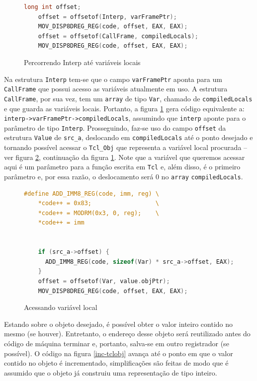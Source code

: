 \begin{figure}[h]
  \centering
  \begin{lstlisting}[language=C]
    long int offset;
    offset = offsetof(Interp, varFramePtr);
    MOV_DISP8DREG_REG(code, offset, EAX, EAX);
    offset = offsetof(CallFrame, compiledLocals);
    MOV_DISP8DREG_REG(code, offset, EAX, EAX);
  \end{lstlisting}
  \caption{Percorrendo Interp até variáveis locais\label{goto-varstruct}}
\end{figure}

Na estrutura \verb!Interp! tem-se que o campo \verb!varFramePtr!
aponta para um \verb!CallFrame! que possui acesso as variáveis atualmente em
uso. A estrutura \verb!CallFrame!, por sua vez, tem um
\verb!array! de tipo \verb!Var!, chamado de \verb!compiledLocals! e
que guarda as variáveis locais. Portanto, a figura
\ref{goto-varstruct} gera código equivalente a:
\verb!interp->varFramePtr->compiledLocals!, assumindo
que \verb!interp! aponte para o parâmetro de tipo
\verb!Interp!. Prosseguindo, faz-se uso do campo
\verb!offset! da estrutura \verb!Value! de \verb!src_a!, deslocando em
\verb!compiledLocals! até o ponto desejado e tornando possível acessar
o \verb!Tcl_Obj! que representa a variável local procurada -- ver figura
\ref{goto-localvar}, continuação da figura \ref{goto-varstruct}. Note
que a variável que queremos acessar aqui é um parâmetro para a função
escrita em \texttt{Tcl} e, além disso, é o primeiro parâmetro e, por
essa razão, o deslocamento será 0 no \verb!array! \verb!compiledLocals!.

\begin{figure}[h]
  \centering
  \begin{lstlisting}[language=C]
#define ADD_IMM8_REG(code, imm, reg) \
    *code++ = 0x83;                  \
    *code++ = MODRM(0x3, 0, reg);    \
    *code++ = imm


    if (src_a->offset) {
      ADD_IMM8_REG(code, sizeof(Var) * src_a->offset, EAX);
    }
    offset = offsetof(Var, value.objPtr);
    MOV_DISP8DREG_REG(code, offset, EAX, EAX);
  \end{lstlisting}
  \caption{Acessando variável local\label{goto-localvar}}
\end{figure}

Estando sobre o objeto desejado, é possível obter o valor inteiro
contido no mesmo (se houver). Entretanto, o endereço desse objeto será
reutilizado antes do código de máquina terminar e, portanto, salva-se
em outro registrador (se possível). O código na
figura \ref{inc-tclobj} avança até o ponto em que o valor contido no
objeto é incrementado, simplificações são feitas de modo que é
assumido que o objeto já construiu uma representação de tipo inteiro.

